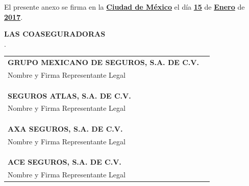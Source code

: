 \documentclass[letterpaper,10pt]{article}
\begin{document}
El presente anexo se firma en la \underline{\textbf{Ciudad de México}} el día \underline{\textbf{15}} de \underline{\textbf{Enero}} de \underline{\textbf{2017}}.\\

\begin{center}
    \textbf{LAS COASEGURADORAS}\\.
    
    \begin{tabu} to \textwidth{X[l]r}
        \textbf{GRUPO MEXICANO DE SEGUROS, S.A. DE C.V.} &\\
        Nombre y Firma Representante Legal & \underline{\hspace{5cm}}\\\\\\\\
        \textbf{SEGUROS ATLAS, S.A. DE C.V.} &\\
        Nombre y Firma Representante Legal & \underline{\hspace{5cm}}\\\\\\\\
        \textbf{AXA SEGUROS, S.A. DE C.V.} &\\
        Nombre y Firma Representante Legal & \underline{\hspace{5cm}}\\\\\\\\
        \textbf{ACE SEGUROS, S.A. DE C.V.} &\\
        Nombre y Firma Representante Legal & \underline{\hspace{5cm}}
    \end{tabu}
\end{center}
	
\end{document}

